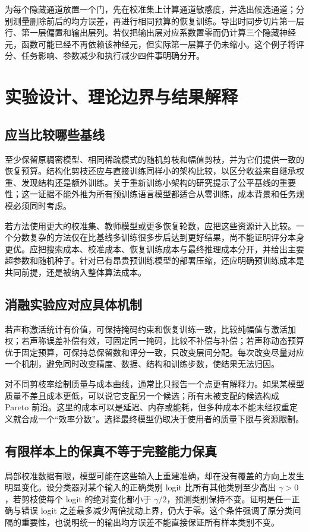 \documentclass[UTF8,12pt,a4paper,fontset=fandol]{ctexart}
\begin{document}
为每个隐藏通道放置一个门，先在校准集上计算通道敏感度，并选出候选通道；分别测量删除前后的均方误差，再进行相同预算的恢复训练。导出时同步切片第一层行、第一层偏置和输出层列。若仅把输出层对应系数置零而仍计算三个隐藏神经元，函数可能已经不再依赖该神经元，但实际第一层算子仍未缩小。这个例子将评分、任务影响、参数减少和执行减少四件事明确分开。

\section{实验设计、理论边界与结果解释}
\label{sec:prune-evaluation}

\subsection{应当比较哪些基线}
至少保留原稠密模型、相同稀疏模式的随机剪枝和幅值剪枝，并为它们提供一致的恢复预算。结构化剪枝还应与直接训练同样小的架构比较，以区分收益来自继承权重、发现结构还是额外训练。关于重新训练小架构的研究提示了公平基线的重要性\cite{liu2019rethinking}；这一证据不能外推为所有预训练语言模型都适合从零训练，成本背景和任务规模必须同时考虑。

若方法使用更大的校准集、教师模型或更多恢复轮数，应把这些资源计入比较。一个分数复杂的方法仅在比基线多训练很多步后达到更好结果，尚不能证明评分本身更优。应把搜索成本、校准成本、恢复训练成本与最终推理成本分开，并给出主要超参数和随机种子。针对已有昂贵预训练模型的部署压缩，还应明确预训练成本是共同前提，还是被纳入整体算法成本。

\subsection{消融实验应对应具体机制}
若声称激活统计有价值，可保持掩码约束和恢复训练一致，比较纯幅值与激活加权；若声称误差补偿有效，可固定同一掩码，比较不补偿与补偿；若声称动态预算优于固定预算，可保持总保留数和评分一致，只改变层间分配。每次改变尽量对应一个机制，避免同时改变精度、数据、结构和训练步数，使结果无法归因。

对不同剪枝率绘制质量与成本曲线，通常比只报告一个点更有解释力。如果某模型质量不差且成本更低，可以说它支配另一个候选；所有未被支配的候选构成 Pareto 前沿。这里的成本可以是延迟、内存或能耗，但多种成本不能未经权重定义就合成一个“效率分数”。选择最终模型仍取决于使用者的质量下限与资源限制。

\subsection{有限样本上的保真不等于完整能力保真}
局部校准数据有限，模型可能在这些输入上重建准确，却在没有覆盖的方向上发生明显变化。设分类器对某个输入的正确类别 logit 比所有其他类别至少高出 $\gamma>0$，若剪枝使每个 logit 的绝对变化都小于 $\gamma/2$，预测类别保持不变。证明是任一正确与错误 logit 之差最多减少两倍扰动上界，仍大于零。这个条件强调了原分类间隔的重要性，也说明统一的输出均方误差不能直接保证所有样本类别不变。
\end{document}
